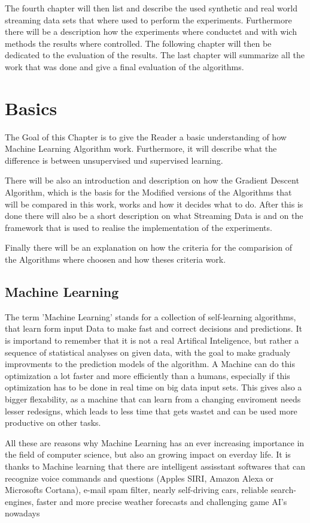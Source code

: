 \documentclass[12pt,oneside,a4paper,parskip]{scrbook}
\begin{document}
The fourth chapter will then list and describe the used synthetic and real world streaming data sets that where used to 
perform the experiments.
Furthermore there will be a description how the experiments where conductet and with wich methods the results where controlled.
The following chapter will then be dedicated to the evaluation of the results. 
The last chapter will summarize all the work that was done and give a final evaluation of the algorithms.

\chapter{Basics}
The Goal of this Chapter is to give the Reader a basic understanding of how Machine Learning Algorithm work. 
Furthermore, it will describe what the difference is between unsupervised und supervised learning. 

There will be also an introduction and description on how the Gradient Descent Algorithm, which is the basis for the 
Modified versions of the Algorithms that will be compared in this work, works and how it decides what to do. 
After this is done there will also be a short description on what Streaming Data is and on the framework that is used to 
realise the implementation of the experiments.

Finally there will be an explanation on how the criteria for the comparision of the Algorithms where choosen and how 
theses criteria work.

\section{Machine Learning}

The term 'Machine Learning' stands for a collection of self-learning algorithms, that learn form input Data to make 
fast and correct decisions and predictions. It is importand to remember that it is not a real Artifical Inteligence, 
but rather a sequence of statistical analyses on given data, with the goal to make gradualy improvments to the prediction 
models of the algorithm.  
A Machine can do this optimization a lot faster and more efficiently than a humans, especially if this optimization has to be 
done in real time on big data input sets. This gives also a bigger flexability, as a machine that can learn from a changing 
enviroment needs lesser redesigns, which leads to less time that gets wastet and can be used more productive on other 
tasks. 

All these are reasons why Machine Learning has an ever increasing importance in the field of computer science, 
but also an growing impact on everday life. It is thanks to Machine learning that there are intelligent assisstant 
softwares that can recognize voice commands and questions (Apples SIRI, Amazon Alexa or Microsofts Cortana),
e-mail spam filter, nearly self-driving cars, reliable search-engines, faster and more precise weather forecasts and 
challenging game AI's nowadays 
\end{document}
